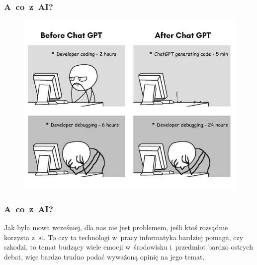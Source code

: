 \documentclass[10pt,t]{beamer}
\begin{document}
\begin{frame}
  \frametitle{A~co~z~AI?}

  \vspace{-0.5em}


  \begin{figure}

    \label{fig:Impact-of-ChatGPT-One-view}

    \centering


    \includegraphics[scale=0.38]
    {./Presentations-pictures/Impact-of-ChatGPT-One-view.jpg}

  \end{figure}

\end{frame}





\begin{frame}
  \frametitle{A~co~z~AI?}


  Jak była mowa wcześniej, dla nas nie jest problemem, jeśli ktoś rozsądnie
  korzysta z~\textsc{ai}. To czy ta technologi w~pracy informatyka
  bardziej pomaga, czy szkodzi, to temat budzący wiele emocji w~środowisku
  i~przedmiot bardzo ostrych debat, więc bardzo trudno podać wyważoną
  opinię na jego temat.

\end{frame}
\end{document}
